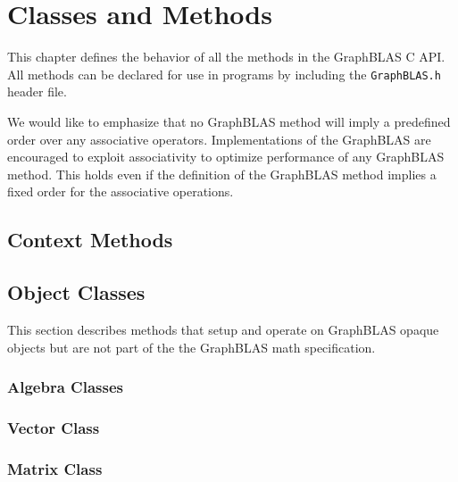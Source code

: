 \chapter{Classes and Methods}
\label{Chp:Methods}

This chapter defines the behavior of all the methods in the GraphBLAS C API.
All methods can be declared for use in programs by including the {\tt GraphBLAS.h} header file.

We would like to emphasize that no GraphBLAS method will imply a predefined order over any associative operators. Implementations of the GraphBLAS are encouraged to exploit associativity to optimize performance of any GraphBLAS method. This holds even if the definition of the GraphBLAS method implies a fixed order for the associative operations.

\section{Context Methods}

\section{Object Classes}

This section describes methods that setup and operate on GraphBLAS opaque objects
but are not part of the the GraphBLAS math specification.

\subsection{Algebra Classes}



\subsection{Vector Class}



\subsection{Matrix Class}



